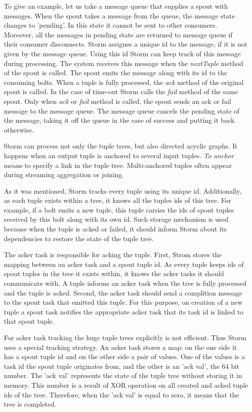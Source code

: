 To give an example, let us take a message queue that supplies a spout with messages.
When the spout takes a message from the queue, the message state changes to 'pending'.
In this state it cannot be sent to other consumers.
Moreover, all the messages in pending state are returned to message queue if their consumer disconnects.
Storm assignes a unique id to the message, if it is not given by the message queue.
Using this id Storm can keep track of this message during processing.
The system receives this message when the \textit{nextTuple} method of the spout is called.
The spout emits the message along with its id to the consuming bolts.
When a tuple is fully processed, the \textit{ack} method of the original spout is called. 
In the case of time-out Storm calls the \textit{fail} method of the same spout.
Only when \textit{ack} or \textit{fail} method is called, the spout sends an ack or fail message to the message queue.
The message queue cancels the pending state of the message, taking it off the queue in the case of success and putting it back otherwise.

Storm can process not only the tuple trees, but also directed acyclic graphs.
It happens when an output tuple is anchored to several input tuples.
\textit{To anchor} means to specify a link in the tuple tree.
Multi-anchored tuples often appear during streaming aggregation or joining.
 
As it was mentioned, Storm tracks every tuple using its unique id.
Additionally, as each tuple exists within a tree, it knows all the tuples ids of this tree.
For example, if a bolt emits a new tuple, this tuple carries the ids of spout tuples received by this bolt along with its own id.
Such storage mechanism is used	because when the tuple is acked or failed, it should inform Storm about its dependencies to restore the state of the tuple tree.  

The acker task is responsible for acking the tuple.
First, Strom stores the mapping between an acker task and a spout tuple id.
As every tuple keeps ids of spout tuples in the tree it exists within, it knows the acker tasks it should communicate with.
A tuple informs an acker task when the tree is fully processed and the tuple is acked.
Second, the acker task should send a complition message to the spout task that emitted this tuple.
For this purpose, on creation of a new tuple a spout task notifies the appropriate acker task that its task id is linked to that spout tuple.

For acker task tracking the huge tuple trees explicitly is not efficient.
Thus Storm uses a special tracking strategy.
An acker task stores a map: on the one side it has a spout tuple id and on the other side a pair of values.
One of the values is a task id the spout tuple originates from, and the other is an 'ack val', the 64 bit number.
The 'ack val' represents the state of the tuple tree without storing it in memory.
This number is a result of XOR operation on all created and acked tuple ids of the tree.
Therefore, when the 'ack val' is equal to zero, it means that the tree is completed.  

